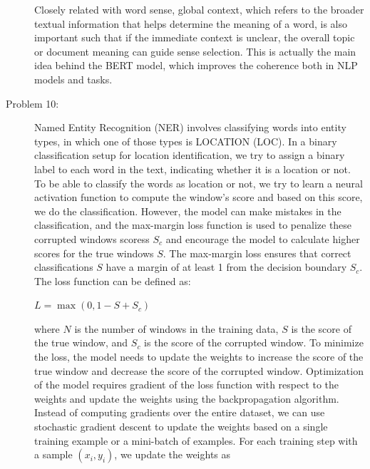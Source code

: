 \documentclass[12pt]{article}
\begin{document}
\begin{description}
\begin{enumerate}
  \end{enumerate}

  Closely related with word sense, global context, which refers to the broader textual information that helps determine the meaning of a word, is also important such that
  if the immediate context is unclear, the overall topic or document meaning can guide sense selection. This is actually the main idea behind the BERT model, which improves
  the coherence both in NLP models and tasks.

  \pagebreak

  \item[Problem 10:] \hfill %
  
  Named Entity Recognition (NER) involves classifying words into entity types, in which one of those types is LOCATION (LOC). In a binary classification setup for 
  location identification, we try to assign a binary label to each word in the text, indicating whether it is a location or not. To be able to classify the words as location
  or not, we try to learn a neural activation function to compute the window's score and based on this score, we do the classification. However, the model can make mistakes
  in the classification, and the max-margin loss function is used to penalize these corrupted windows scoress $S_c$ and encourage the model to calculate higher scores for the 
  true windows $S$. The max-margin loss ensures that correct classifications $S$ have a margin of at least 1 from the decision boundary $S_c$. The loss function can be defined as:

  \begin{center}
    $\displaystyle{L = \max(0, 1 - S + S_c)}$
  \end{center}
  
  where $N$ is the number of windows in the training data, $S$ is the score of the true window, and $S_c$ is the score of the corrupted window. To minimize the loss, the model
  needs to update the weights to increase the score of the true window and decrease the score of the corrupted window. Optimization of the model requires gradient of the loss 
  function with respect to the weights and update the weights using the backpropagation algorithm. Instead of computing gradients over the entire dataset, we can use stochastic
  gradient descent to update the weights based on a single training example or a mini-batch of examples. For each training step with a sample $(x_i, y_i)$, we update the weights
  as


\end{description}
\end{document}
